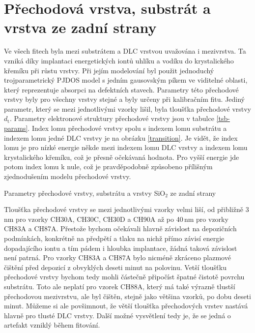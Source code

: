 \section{Přechodová vrstva, substrát a vrstva ze zadní strany}
Ve všech fitech byla mezi substrátem a DLC vrstvou uvažována i mezivrstva. Ta vzniká díky implantaci energetických iontů uhlíku a vodíku do krystalického křemíku při růstu vrstvy. 
Při jejím modelování byl použit jednoduchý trojparametrický PJDOS model s jedním gausovským píkem ve viditelné oblasti, který reprezentuje absorpci na defektních stavech. 
Parametry této přechodové vrstvy byly pro všechny vrstvy stejné a byly určeny při kalibračním fitu. Jediný parametr, který se mezi jednotlivými vzorky lišil, byla tloušťka přechodové vrstvy $d_\mathrm{t}$. 
Parametry elektronové struktury přechodové vrstvy jsou v tabulce \ref{tsb-params}. Index lomu přechodové vrstvy spolu s indexem lomu substrátu a indexem lomu jedné DLC vrstvy je na obrázku \ref{transition}. 
Je vidět, že index lomu je pro nízké energie někde mezi indexem lomu DLC vrstvy a indexem lomu krystalického křemíku, což je přesně očekávaná hodnota. Pro vyšší energie jde potom index lomu k nule, což je pravděpodobně způsobeno přílišným zjednodušením modelu přechodové vrstvy.

\begin{table}[tbhp]
 \centering
	\renewcommand{\tabcolsep}{4pt}
 
 \caption{Parametry přechodové vrstvy, substrátu a vrstvy SiO$_2$ ze zadní strany}
\label{tsb-params}
\end{table}

Tloušťka přechodové vrstvy se mezi jednotlivými vzorky velmi liší, od přibližně 3\,nm pro vzorky CH30A, CH30C, CH30D a CH90A až po 40\,nm pro vzorky CH83A a CH87A. Přestože bychom očekávali hlavně závislost na depozičních podmínkách, konkrétně na předpětí a tlaku na nichž přímo závisí energie dopadajícího iontu a tím pádem i hloubka implantace, žádná taková závislost není patrná. Pro vzorky CH83A a CH87A bylo nicméně zkráceno plazmové čištění před depozicí z obvyklých deseti minut na polovinu. Vetší tloušťku přechodové vrstvy bychom tedy mohli částečně připočíst špatné čistotě povrchu substrátu. Toto ale neplatí pro vzorek CH88A, který má také výrazně tlustší přechodovou mezivrstvu, ale byl čištěn, stejně jako většina vzorků, po dobu deseti minut. Můžeme si ale povšimnout, že větší tloušťka přechodových vrstev nastává hlavně pro tlusté DLC vrstvy. Další možné vysvětlení tedy je, že se jedná o artefakt vzniklý během fitování.

